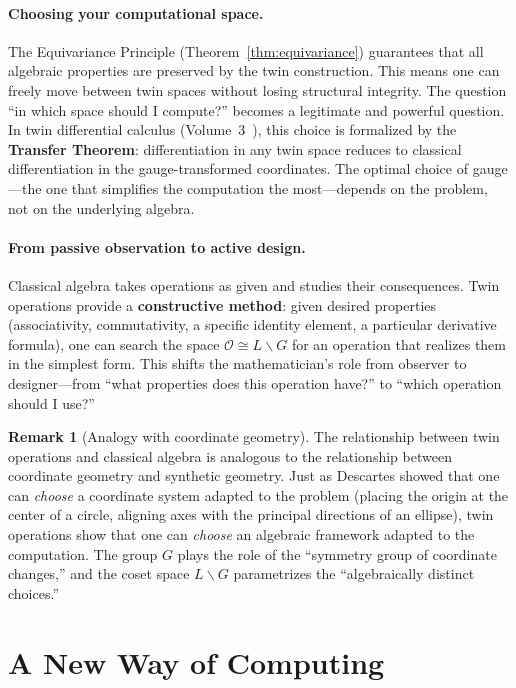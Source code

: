 \documentclass[11pt,a4paper,openany]{book}
\theoremstyle{plain}
\theoremstyle{definition}
\newtheorem{remark}[theorem]{Remark}
\newcommand{\opspace}{\mathcal{O}}
\newcommand{\lingroup}{L}
\newcommand{\groupG}{G}
\begin{document}
\paragraph{Choosing your computational space.} The Equivariance Principle (Theorem~\ref{thm:equivariance}) guarantees that all algebraic properties are preserved by the twin construction. This means one can freely move between twin spaces without losing structural integrity. The question ``in which space should I compute?'' becomes a legitimate and powerful question. In twin differential calculus (Volume~3~\cite{Vol03}), this choice is formalized by the \textbf{Transfer Theorem}: differentiation in any twin space reduces to classical differentiation in the gauge-transformed coordinates. The optimal choice of gauge---the one that simplifies the computation the most---depends on the problem, not on the underlying algebra.

\paragraph{From passive observation to active design.} Classical algebra takes operations as given and studies their consequences. Twin operations provide a \textbf{constructive method}: given desired properties (associativity, commutativity, a specific identity element, a particular derivative formula), one can search the space $\opspace \cong \lingroup\backslash\groupG$ for an operation that realizes them in the simplest form. This shifts the mathematician's role from observer to designer---from ``what properties does this operation have?'' to ``which operation should I use?''

\begin{remark}[Analogy with coordinate geometry]
The relationship between twin operations and classical algebra is analogous to the relationship between coordinate geometry and synthetic geometry. Just as Descartes showed that one can \emph{choose} a coordinate system adapted to the problem (placing the origin at the center of a circle, aligning axes with the principal directions of an ellipse), twin operations show that one can \emph{choose} an algebraic framework adapted to the computation. The group $\groupG$ plays the role of the ``symmetry group of coordinate changes,'' and the coset space $\lingroup\backslash\groupG$ parametrizes the ``algebraically distinct choices.''
\end{remark}


\section{A New Way of Computing}
\end{document}
